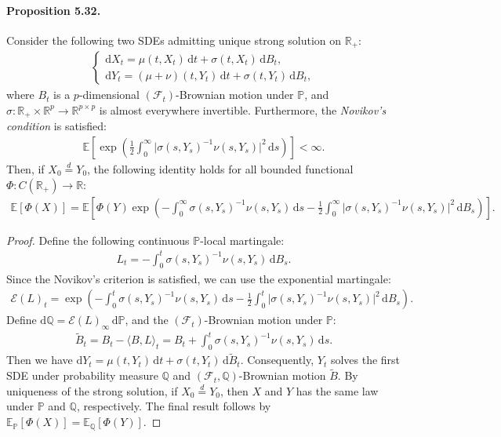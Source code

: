 \documentclass{article}
\numberwithin{equation}{section}
\newcommand{\E}{\mathbb{E}}
\renewcommand{\P}{\mathbb{P}}
\newcommand{\bbP}{\mathbb{P}}
\newcommand{\bbQ}{\mathbb{Q}}
\renewcommand{\d}{\mathrm{d}}
\theoremstyle{plain}
\theoremstyle{definition}
\begin{document}
\paragraph{Proposition 5.32.\label{prop:5.32}} Consider the following two SDEs admitting unique strong solution on $\mathbb{R}_+$:
\begin{align*}
	\begin{cases}
		\d X_t = \mu(t,X_t)\,\d t + \sigma(t,X_t)\,\d B_t,\\
		\d Y_t = (\mu+\nu)(t,Y_t)\,\d t + \sigma(t,Y_t)\,\d B_t,
	\end{cases}
\end{align*}
where $B_t$ is a $p$-dimensional $(\mathscr{F}_t)$-Brownian motion under $\bbP$, and $\sigma:\mathbb{R}_+\times\mathbb{R}^p\to\mathbb{R}^{p\times p}$ is almost everywhere invertible. Furthermore, the \textit{Novikov's condition} is satisfied:
\begin{align*}
	\E\left[\exp\left(\frac{1}{2}\int_0^\infty\vert\sigma(s,Y_s)^{-1}\nu(s,Y_s)\vert^2\,\d s\right)\right]<\infty.
\end{align*}
Then, if $X_0\overset{d}{=}Y_0$, the following identity holds for all bounded functional $\Phi:C(\mathbb{R}_+)\to\mathbb{R}$:
\begin{align*}
	\E\left[\Phi(X)\right]=\E\left[\Phi(Y)\exp\left(-\int_0^\infty\sigma(s,Y_s)^{-1}\nu(s,Y_s)\,\d s-\frac{1}{2}\int_0^\infty\vert\sigma(s,Y_s)^{-1}\nu(s,Y_s)\vert^2\,\d B_s\right)\right].
\end{align*}
\begin{proof}
Define the following continuous $\P$-local martingale:
\begin{align*}
	L_t = -\int_0^t\sigma(s,Y_s)^{-1}\nu(s,Y_s)\,\d B_s.
\end{align*}
Since the Novikov's criterion is satisfied, we can use the exponential martingale:
\begin{align*}
	\mathscr{E}(L)_t = \exp\left(-\int_0^t\sigma(s,Y_s)^{-1}\nu(s,Y_s)\,\d s-\frac{1}{2}\int_0^t\vert\sigma(s,Y_s)^{-1}\nu(s,Y_s)\vert^2\,\d B_s\right).
\end{align*}
Define $\d\bbQ = \mathscr{E}(L)_\infty\,\d\bbP$, and the $(\mathscr{F}_t)$-Brownian motion under $\bbP$:
\begin{align*}
\widetilde{B}_t = B_t - \langle B,L\rangle_t = B_t + \int_0^t\sigma(s,Y_s)^{-1}\nu(s,Y_s)\,\d s.
\end{align*}
Then we have $\d Y_t = \mu(t,Y_t)\,\d t + \sigma(t,Y_t)\,\d\widetilde{B}_t$. Consequently, $Y_t$ solves the first SDE under probability measure $\bbQ$ and $(\mathscr{F}_t,\bbQ)$-Brownian motion $\widetilde{B}$. By uniqueness of the strong solution, if $X_0\overset{d}{=}Y_0$, then $X$ and $Y$ has the same law under $\bbP$ and $\bbQ$, respectively. The final result follows by $\E_\bbP\left[\Phi(X)\right]=\E_\bbQ\left[\Phi(Y)\right]$.
\end{proof}
\end{document}
